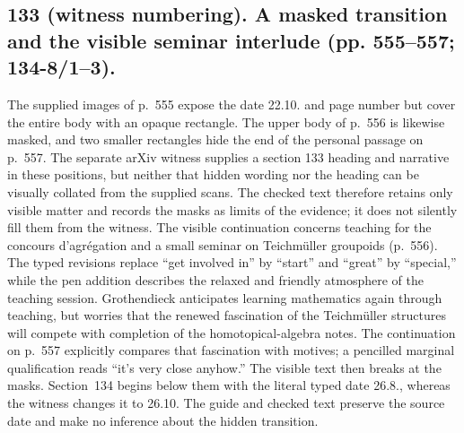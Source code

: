 \documentclass[10pt,oneside]{book}
\begin{document}
\subsection*{133 (witness numbering). A masked transition and the visible seminar interlude (pp. 555--557; 134-8/1--3).}
The supplied images of p.~555 expose the date 22.10. and page number but cover the entire body with an opaque rectangle. The upper body of p.~556 is likewise masked, and two smaller rectangles hide the end of the personal passage on p.~557. The separate arXiv witness supplies a section 133 heading and narrative in these positions, but neither that hidden wording nor the heading can be visually collated from the supplied scans. The checked text therefore retains only visible matter and records the masks as limits of the evidence; it does not silently fill them from the witness. The visible continuation concerns teaching for the concours d'agr\'egation and a small seminar on Teichm\"uller groupoids (p.~556). The typed revisions replace ``get involved in'' by ``start'' and ``great'' by ``special,'' while the pen addition describes the relaxed and friendly atmosphere of the teaching session. Grothendieck anticipates learning mathematics again through teaching, but worries that the renewed fascination of the Teichm\"uller structures will compete with completion of the homotopical-algebra notes. The continuation on p.~557 explicitly compares that fascination with motives; a pencilled marginal qualification reads ``it's very close anyhow.'' The visible text then breaks at the masks. Section~134 begins below them with the literal typed date 26.8., whereas the witness changes it to 26.10. The guide and checked text preserve the source date and make no inference about the hidden transition.
\end{document}
